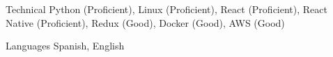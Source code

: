 
\begin{cvskills}

  \cvskill
  {Technical} %
  {Python (Proficient), Linux (Proficient), React (Proficient), React Native (Proficient), Redux (Good), Docker (Good), AWS (Good)} %

  \cvskill
  {Languages} %
  {Spanish, English} %

\end{cvskills}

